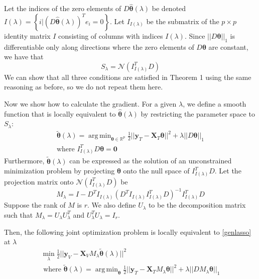 \documentclass[10pt,letterpaper]{article}
\DeclareMathOperator*{\argmin}{arg\,min}
\begin{document}
Let the indices of the zero elements of $D \hat{\boldsymbol{\theta}}(\lambda)$ be denoted $I(\lambda) = \left \{i | (D \hat{\boldsymbol{\theta}}(\lambda))^T e_i = 0 \right \}$.
Let $I_{I(\lambda)}$ be the submatrix of the $p \times p$ identity matrix $I$ consisting of columns with indices $I(\lambda)$. Since $||D \boldsymbol{\theta}||_1$ is differentiable only along directions where the zero elements of $D \boldsymbol{\theta}$ are constant, we have that
\begin{equation}
S_\lambda = \mathcal{N}(I_{I(\lambda)}^T D)
\end{equation}
We can show that all three conditions are satisfied in Theorem 1 using the same reasoning as before, so we do not repeat them here.

Now we show how to calculate the gradient. For a given $\lambda$, we define a smooth function that is locally equivalent to $\hat{\boldsymbol\theta}(\lambda)$ by restricting the parameter space to $S_\lambda$:
\begin{equation}
\begin{array}{c}
\tilde{\boldsymbol{\theta}} (\lambda) =
\argmin_{\boldsymbol{\theta} \in \mathbb{R}^p}
\frac{1}{2} \lvert\lvert \boldsymbol{y}_T - \boldsymbol{X}_T \boldsymbol{\theta} \rvert\rvert ^2
+ \lambda \lvert\lvert D \boldsymbol{\theta} \rvert \rvert_1\\
\text{where }
I_{I(\lambda)}^T D\boldsymbol\theta = \boldsymbol 0
\end{array}
\label{genlassorestricted}
\end{equation}
Furthermore, $\tilde{\boldsymbol{\theta}} (\lambda)$ can be expressed as the solution of an unconstrained minimization problem by projecting $\boldsymbol{\theta}$ onto the null space of $I_{I(\lambda)}^T D$. Let the projection matrix onto $\mathcal{N}(I_{I(\lambda)}^T D)$ be
\begin{equation}
M_\lambda = I - D^T I_{I(\lambda)} \left ( D^T I_{I(\lambda)} I_{I(\lambda)}^T D\right )^{-1} I_{I(\lambda)}^T D
\end{equation}
Suppose the rank of $M$ is $r$. We also define $U_\lambda$ to be the decomposition matrix such that $ M_\lambda =  U_\lambda U_\lambda^T$ and $ U_\lambda^T  U_\lambda = I_r$.

Then, the following joint optimization problem is locally equivalent  to \eqref{genlasso} at $\lambda$
\begin{equation}
\begin{array}{c}
\min_{\lambda} \frac{1}{2} \lvert\lvert \boldsymbol{y}_V - \boldsymbol{X}_V M_\lambda \tilde{\boldsymbol{\theta}} (\lambda) \rvert\rvert ^2 \\
\text{ where }
\tilde{\boldsymbol{\theta}} (\lambda) =
\argmin_{\boldsymbol{\theta}}
\frac{1}{2} \lvert\lvert \boldsymbol{y}_T - \boldsymbol{X}_T M_\lambda \boldsymbol{\theta} \rvert\rvert ^2
+ \lambda \lvert\lvert D M_\lambda \boldsymbol{\theta} \rvert \rvert_1
\end{array}
\label{genlassoeasy}
\end{equation}
\end{document}

